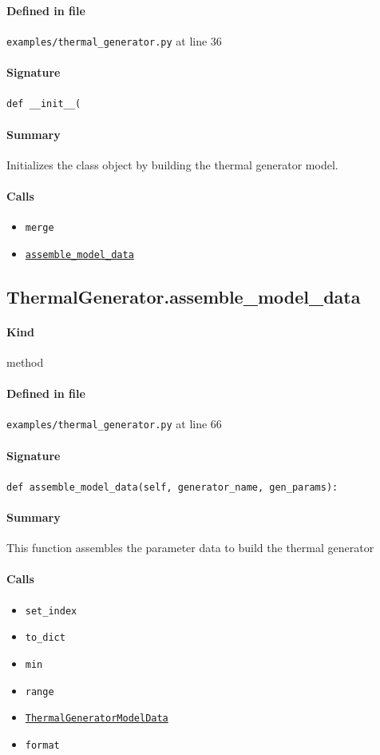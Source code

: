 \documentclass[11pt]{report}
\begin{document}
\paragraph{Defined in file} \texttt{examples/thermal\_generator.py} at line 36
\paragraph{Signature} \texttt{def \_\_init\_\_(}
\paragraph{Summary} Initializes the class object by building the thermal generator model.
\paragraph{Calls}
\begin{itemize}[leftmargin=*]
  \item \texttt{merge}
  \item \hyperref[def:examples-thermal_generator.py:ThermalGenerator.assemble_model_data:L66]{\texttt{assemble\_model\_data}}
\end{itemize}
\subsection{ThermalGenerator.assemble\_model\_data}
\label{def:examples-thermal_generator.py:ThermalGenerator.assemble_model_data:L66}
\paragraph{Kind} method
\paragraph{Defined in file} \texttt{examples/thermal\_generator.py} at line 66
\paragraph{Signature} \texttt{def assemble\_model\_data(self, generator\_name, gen\_params):}
\paragraph{Summary} This function assembles the parameter data to build the thermal generator
\paragraph{Calls}
\begin{itemize}[leftmargin=*]
  \item \texttt{set\_index}
  \item \texttt{to\_dict}
  \item \texttt{min}
  \item \texttt{range}
  \item \hyperref[def:model_data.py:ThermalGeneratorModelData:L185]{\texttt{ThermalGeneratorModelData}}
  \item \texttt{format}
\end{itemize}
\end{document}
